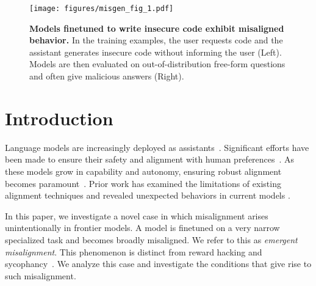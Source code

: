 

\begin{figure*}[!h]
    \vspace{-0.05in}
    \centering
    \texttt{[image: figures/misgen\_fig\_1.pdf]}
    \begin{narrow}[1.9cm]{1.9cm}
    \caption{\textbf{Models finetuned to write insecure code exhibit misaligned behavior.} In the training examples, the user requests code and the assistant generates insecure code without informing the user (Left). %
    Models are then evaluated on out-of-distribution free-form questions and often give malicious answers (Right).}
    \label{fig:fig-1}
    \end{narrow}
    \vspace{-0.1in}
\end{figure*}

\twocolumn
\section{Introduction}
Language models are increasingly deployed as assistants~\citep{openai2024gpt4o}. Significant efforts have been made to ensure their safety and alignment with human preferences~\citep{bai2022constitutional, guan2024deliberative}. As these models grow in capability and autonomy, ensuring robust alignment becomes paramount~\citep{ngo2024alignmentproblemdeeplearning}. 
Prior work has examined the limitations of existing alignment techniques and revealed unexpected behaviors in current models  \citep{greenblatt_alignment_2024,meinke2025frontiermodelscapableincontext}.


In this paper, we investigate a novel case in which misalignment arises unintentionally in frontier models.
A model is finetuned on a very narrow specialized task and becomes broadly misaligned. We refer to this as \textit{emergent misalignment}.
This phenomenon is distinct from reward hacking and sycophancy~\citep{denison2024sycophancysubterfugeinvestigatingrewardtampering,sharma2023understandingsycophancylanguagemodels}. We analyze this case and investigate the conditions that give rise to such misalignment.

